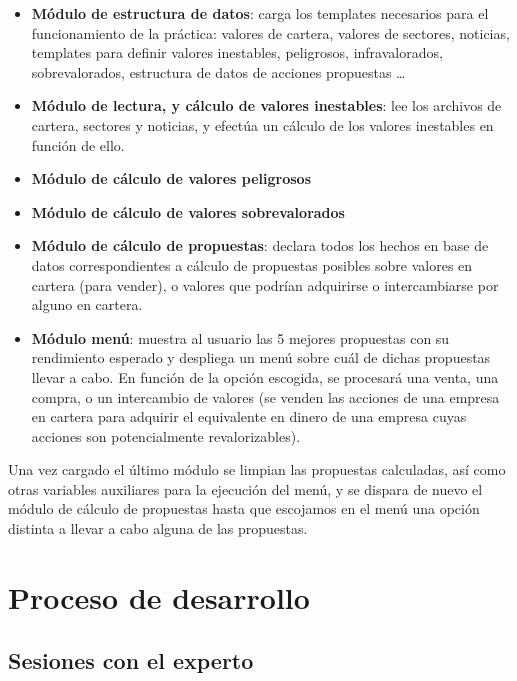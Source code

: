 \documentclass[a4paper,11pt]{article}
\begin{document}
\begin{itemize}
  \item \textbf{Módulo de estructura de datos}: carga los templates necesarios para el funcionamiento de la práctica: valores de cartera,
  valores de sectores, noticias, templates para definir valores inestables, peligrosos, infravalorados, sobrevalorados,
  estructura de datos de acciones propuestas \ldots

  \item \textbf{Módulo de lectura, y cálculo de valores inestables}: lee los archivos de cartera, sectores y noticias, y
  efectúa un cálculo de los valores inestables en función de ello.

  \item \textbf{Módulo de cálculo de valores peligrosos}
  
  \item \textbf{Módulo de cálculo de valores sobrevalorados}
  
  \item \textbf{Módulo de cálculo de propuestas}: declara todos los hechos en base de datos correspondientes a cálculo de
  propuestas posibles sobre valores en cartera (para vender), o valores que podrían adquirirse o intercambiarse por alguno en cartera.
  
  \item \textbf{Módulo menú}: muestra al usuario las 5 mejores propuestas con su rendimiento esperado y despliega un menú 
  sobre cuál de dichas propuestas llevar a cabo. En función de la opción escogida, se procesará una venta, una compra, o un
  intercambio de valores (se venden las acciones de una empresa en cartera para adquirir el equivalente en dinero de una
  empresa cuyas acciones son potencialmente revalorizables).
\end{itemize}

Una vez cargado el último módulo se limpian las propuestas calculadas, así como otras variables auxiliares para la ejecución
del menú, y se dispara de nuevo el módulo de cálculo de propuestas hasta que escojamos en el menú una opción distinta a
llevar a cabo alguna de las propuestas.

\section{Proceso de desarrollo}

\subsection{Sesiones con el experto}
  
\end{document}
